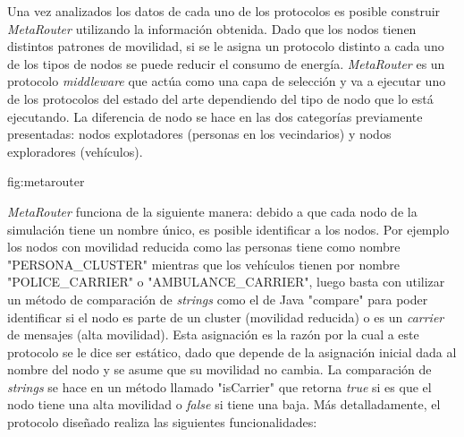 

Una vez analizados los datos de cada uno de los protocolos es posible construir
\textit{MetaRouter} utilizando la información obtenida. Dado que los nodos
tienen distintos patrones de movilidad, si se le asigna un protocolo distinto a
cada uno de los tipos de nodos se puede reducir el consumo de energía.
\textit{MetaRouter} es un protocolo \textit{middleware} que actúa como una capa
de selección y va a ejecutar uno de los protocolos del estado del arte
dependiendo del tipo de nodo que lo está ejecutando. La diferencia de nodo se
hace en las dos categorías previamente presentadas: nodos explotadores (personas
en los vecindarios) y nodos exploradores (vehículos).


{}{fig:metarouter}


\textit{MetaRouter} funciona de la siguiente manera: debido a que cada nodo de
la simulación tiene un nombre único, es posible identificar a los nodos. Por
ejemplo los nodos con movilidad reducida como las personas tiene como nombre
"PERSONA\_CLUSTER" mientras que los vehículos tienen por nombre
"POLICE\_CARRIER" o "AMBULANCE\_CARRIER", luego basta con utilizar un método de
comparación de \textit{strings} como el de Java "compare" para poder identificar
si el nodo es parte de un cluster (movilidad reducida) o es un \textit{carrier}
de mensajes (alta movilidad). Esta asignación es la razón por la cual a este
protocolo se le dice ser estático, dado que depende de la asignación inicial
dada al nombre del nodo y se asume que su movilidad no cambia. La comparación de
\textit{strings} se hace en un método llamado "isCarrier" que retorna
\textit{true} si es que el nodo tiene una alta movilidad o \textit{false} si
tiene una baja. Más detalladamente, el protocolo diseñado realiza las siguientes
funcionalidades:

